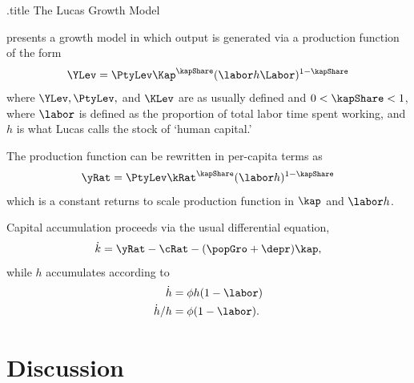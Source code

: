 \documentclass{handout}
\begin{document}
\handoutHeader

\begin{verbatimwrite}{\jobname.title}
The Lucas Growth Model
\end{verbatimwrite}

\handoutNameMake



\newcommand{\hLucas}{h}

\cite{lucasGrowth} presents a growth model in which output is generated via a production function of the form
\begin{equation}
  \label{eq:aggY}
  \YLev = \PtyLev \Kap^{\kapShare} (\labor \hLucas \Labor)^{1-\kapShare}
\end{equation}
where $\YLev, \PtyLev,$ and $\KLev$ are as usually defined and $0 < \kapShare < 1$, where $\labor$ is defined as the proportion of total labor time
spent working, and $\hLucas$ is what Lucas calls the stock of `human 
capital.'  

The production function can be rewritten in per-capita terms as
\begin{equation}
  \label{eq:pcy}
  \yRat = \PtyLev \kRat^\kapShare (\labor \hLucas)^{1-\kapShare}
\end{equation}
which is a constant returns to scale production function in 
$\kap$ and $\labor \hLucas$.  

Capital accumulation proceeds via the usual differential equation,
\begin{equation}
  \label{eq:kdot}
  \dot{k} = \yRat - \cRat - (\popGro+\depr) \kap,
\end{equation}
while $\hLucas$ accumulates according to
\begin{equation}\begin{gathered}\begin{aligned}
  \label{eq:hdot}
  \dot{\hLucas} & =  \phi \hLucas (1-\labor)
\\ \dot{\hLucas}/h & =  \phi (1-\labor).
\end{aligned}\end{gathered}\end{equation}

\section{Discussion}
\end{document}
